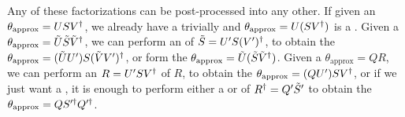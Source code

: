 Any of these factorizations can be post-processed into any other.
%
If given an  $\theta_\text{approx} = U S V^\dagger$, we already have a  trivially and $\theta_\text{approx} = U (S V^\dagger)$ is a .
%
Given a  $\theta_\text{approx} = \tilde U \tilde S \tilde V^\dagger$, we can perform an  of $\tilde S = U' S (V')^\dagger$, to obtain the  $\theta_\text{approx} = (\tilde U U') S (\tilde V V')^\dagger$, or form the  $\theta_\text{approx} = \tilde U (\tilde S \tilde V^\dagger)$.
%
Given a  $\theta_\text{approx} = Q R$, we can perform an  $R = U' S V^\dagger$ of $R$, to obtain the  $\theta_\text{approx} = (Q U') S V^\dagger$, or if we just want a , it is enough to perform either a  or  of $R^\dagger = Q' \tilde S'$ to obtain the  $\theta_\text{approx} = Q S'^\dagger Q'^\dagger$.



